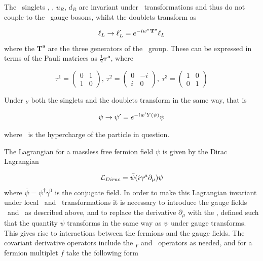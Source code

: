 The \sutwo\ singlets \eR, \nuR, $u_{R}$, $d_{R}$ are invariant under \sutwo\
transformations and thus do not couple to the \Wmu\ gauge bosons, whilst the
doublets transform as

\begin{equation}
\ell_{L} \rightarrow \ell_{L}' = e^{-iw^{a}\mathbf{T^{a}}}\ell_{L}
\end{equation}
where the $\mathbf{T^{a}}$ are the three generators of the \sutwo\ group. These
can be expressed in terms of the Pauli matrices as $\frac{1}{2}
\mathbf{\tau^{a}}$, where

\begin{equation}
\tau^{1} = \left( \begin{array}{cc} 0 & 1 \\ 1 & 0 \end{array} \right), \  
\tau^{2} = \left( \begin{array}{cc} 0 & -i \\ i & 0 \end{array} \right), \  
\tau^{3} = \left( \begin{array}{cc} 1 & 0 \\ 0 & 1 \end{array} \right)
\label{eqn:pauli-matrices}
\end{equation}

Under \uone$_{Y}$ both the singlets and the doublets transform in the same way,
that is

\begin{align}
\psi \ra \psi' = e^{-i w' \hyperY(\psi)} \psi
\label{eqn:u1-transofrmation}
\end{align}

where \hyperY\ is the hypercharge of the particle in question.

The Lagrangian for a massless free fermion field $\psi$ is given by the Dirac Lagrangian

\begin{equation}
\Lagr_{Dirac} = \bar{\psi} ( i \gamma^\mu \partial_{\mu} ) \psi
\end{equation}
where $\bar{\psi} = \psi^{\dagger}\gamma^{0}$ is the conjugate field. In order to
make this Lagrangian invariant under local \uone\ and \sutwo\ transformations it is
necessary to introduce the gauge fields \Bmu\ and \Wmu\ as described above, and
to replace the derivative $\partial_{\mu}$ with the \intro{covariant derivative}
\Dmu,
defined such that the quantity \Dmu$\psi$ transforms in the same way as $\psi$
under gauge transforms. This gives rise to interactions between the
fermions and the gauge fields. The covariant derivative operators include the
\uone$_{Y}$ and \sutwo\ operators as needed, and for a fermion multiplet $f$
take the following form

